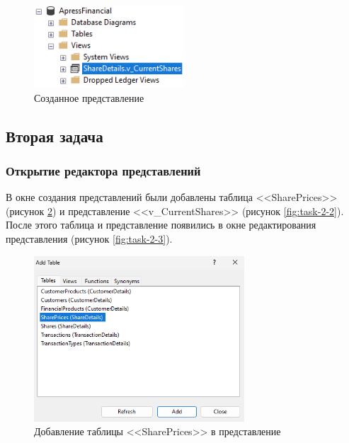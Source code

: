 \documentclass[a4paper, 14pt]{extarticle}
\begin{document}
\begin{figure}[H]
  \centering
  \includegraphics[width=0.5\textwidth]{images/task-1/5.png}
  \caption{Созданное представление}
  \label{fig:task-1-5}
\end{figure}

\subsection{Вторая задача}

\subsubsection{Открытие редактора представлений}

В окне создания представлений были добавлены таблица
<<\foreignlanguage{english}{SharePrices}>> (рисунок \ref{fig:task-2-1}) и
представление <<\foreignlanguage{english}{v\_CurrentShares}>> (рисунок
\ref{fig:task-2-2}). После этого таблица и представление появились в окне
редактирования представления (рисунок \ref{fig:task-2-3}).

\begin{figure}[H]
  \centering
  \includegraphics[width=0.7\textwidth]{images/task-2/1.png}
  \caption{
    Добавление таблицы <<\foreignlanguage{english}{SharePrices}>> в
    представление
  }
  \label{fig:task-2-1}
\end{figure}
\end{document}
